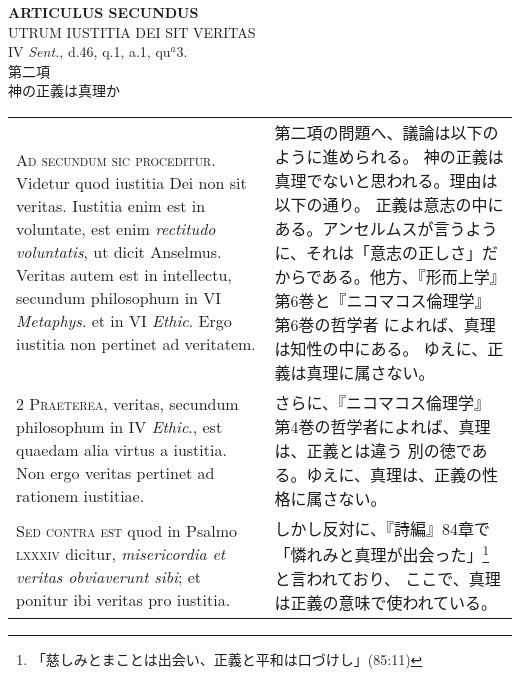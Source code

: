 \documentclass[10pt]{jsarticle} %
\begin{document}
{\begin{longtable}{p{21em}p{21em}}
\end{longtable}
\newpage








\begin{center}
 {\Large {\bf ARTICULUS SECUNDUS}}\\
 {\large UTRUM IUSTITIA DEI SIT VERITAS}\\
 {\footnotesize IV {\itshape Sent.}, d.46, q.1, a.1, qu$^a$3.}\\
 {\Large 第二項\\神の正義は真理か}
\end{center}

\begin{longtable}{p{21em}p{21em}}







{\Huge A}{\scshape d secundum sic proceditur}. Videtur quod
iustitia Dei non sit veritas. Iustitia enim est in voluntate, est enim
{\itshape rectitudo voluntatis}, ut dicit Anselmus. Veritas autem est in
intellectu, secundum philosophum in VI {\itshape Metaphys}. et in VI {\itshape Ethic}. Ergo
iustitia non pertinet ad veritatem.


&

第二項の問題へ、議論は以下のように進められる。
神の正義は真理でないと思われる。理由は以下の通り。
正義は意志の中にある。アンセルムスが言うように、それは「意志の正しさ」だ
 からである。他方、『形而上学』第6巻と『ニコマコス倫理学』第6巻の哲学者
 によれば、真理は知性の中にある。
ゆえに、正義は真理に属さない。

\\


{\scshape 2 Praeterea}, veritas, secundum philosophum in
IV {\itshape Ethic}., est quaedam alia virtus a iustitia. Non ergo veritas pertinet
ad rationem iustitiae.


&


さらに、『ニコマコス倫理学』第4巻の哲学者によれば、真理は、正義とは違う
 別の徳である。ゆえに、真理は、正義の性格に属さない。

\\


{\scshape Sed contra est} quod in Psalmo {\scshape lxxxiv}
dicitur, {\itshape misericordia et veritas obviaverunt sibi}; et ponitur ibi
veritas pro iustitia.


&


しかし反対に、『詩編』84章で「憐れみと真理が出会った」\footnote{「慈しみとまことは出会い、正義と平和は口づけし」(85:11)}と言われており、
 ここで、真理は正義の意味で使われている。


\end{longtable}}
\end{document}
